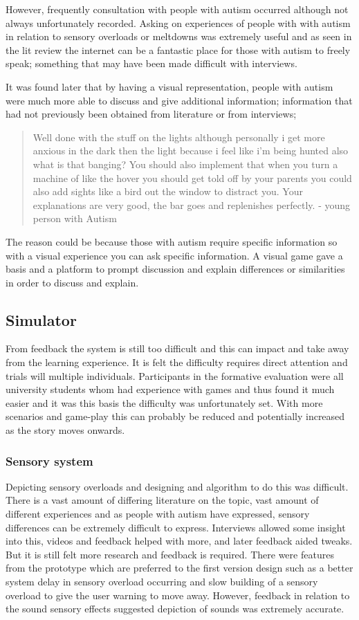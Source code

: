 However, frequently consultation with people with autism occurred although not always unfortunately recorded. Asking on experiences of people with with autism in relation to sensory overloads or meltdowns was extremely useful and as seen in the lit review the internet can be a fantastic place for those with autism to freely speak; something that may have been made difficult with interviews.

It was found later that by having a visual representation, people with autism were much more able to discuss and give additional information; information that had not previously been obtained from literature or from interviews; 

\begin{quote}
Well done with the stuff on the lights although personally i get more anxious in the dark then the light because i feel like i'm being hunted also what is that banging? You should also implement that when you turn a machine of like the hover you should get told off by your parents you could also add sights like a bird out the window to distract you. Your explanations are very good, the bar goes and replenishes perfectly. - young person with Autism
\end{quote}

The reason could be because those with autism require specific information so with a visual experience you can ask specific information. A visual game gave a basis and a platform to prompt discussion and explain differences or similarities in order to discuss and explain. 


\subsection{Simulator}
From feedback the system is still too difficult and this can impact and take away from the learning experience. It is felt the difficulty requires direct attention and trials will multiple individuals. Participants in the formative evaluation were all university students whom had experience with games and thus found it much easier and it was this basis the difficulty was unfortunately set. With more scenarios and game-play this can probably be reduced and potentially increased as the story moves onwards.
 
\subsubsection{Sensory system}
Depicting sensory overloads and designing and algorithm to do this was difficult. There is a vast amount of differing literature on the topic, vast amount of different experiences and as people with autism have expressed, sensory differences can be extremely difficult to express. Interviews allowed some insight into this, videos and feedback helped with more, and later feedback aided tweaks. But it is still felt more research and feedback is required. There were features from the prototype which are preferred to the first version design such as a better system delay in sensory overload occurring and slow building of a sensory overload to give the user warning to move away. However, feedback in relation to the sound sensory effects suggested depiction of sounds was extremely accurate. 


